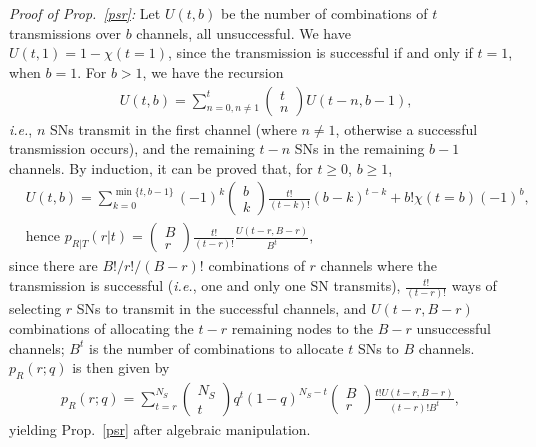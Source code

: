 \documentclass[10pt,twocolumn,twoside]{IEEEtran}
\theoremstyle{plain}
\newcommand{\nn}{\nonumber}
\begin{document}
\section{}
\label{proofoflemchannel}
\noindent\emph{Proof of Prop.~\ref{psr}:}
 Let $U(t,b)$ be the number of combinations of $t$ transmissions over $b$ channels, all unsuccessful.
We have $U(t,1){=}1{-}\chi(t{=}1)$, since the transmission is successful if and only if $t{=}1$, when $b{=}1$.
For $b>1$, we have the recursion
\begin{align*}
&U(t,b)=\sum_{n=0,n\neq 1}^t\left(\begin{array}{c}t\\n\end{array}\right)U(t-n,b-1),
\end{align*}
\emph{i.e.}, $n$ SNs transmit in the first channel (where $n\neq 1$, otherwise 
a successful transmission occurs), and the remaining $t-n$ SNs in the remaining $b-1$ channels.
By induction, it can be proved that, for $t\geq 0$, $b\geq 1$,
\begin{align}
\nn
&U(t,b)\!=\!\!\!\!\!\!\!\!\!\!\sum_{k=0}^{\min\{t,b-1\}}\!\!\!\!\!\!\!\!(-1)^k\!\!
\left(\begin{array}{c}\!\!b\!\!\\\!\!k\!\!\end{array}\right)\!\!
\frac{t!}{(t-k)!}
(b-k)^{t-k}
\!+b!\chi(t=b)(-1)^b,
\\&
\text{hence }p_{R|T}(r|t)=\left(\begin{array}{c}B\\r\end{array}\right)\frac{t!}{(t-r)!}\frac{U(t-r,B-r)}{B^t},
\end{align}
since there are $B!/r!/(B-r)!$ combinations 
of $r$ channels where the transmission is successful (\emph{i.e.}, one and only one SN transmits),
$\frac{t!}{(t-r)!}$ ways of selecting $r$ SNs to transmit in the successful channels, and 
$U(t-r,B-r)$ combinations of allocating the $t-r$ remaining nodes to the $B-r$ unsuccessful channels;
$B^t$ is the number of combinations to allocate $t$ SNs to $B$ channels.
$p_R(r;q)$ is then given by
\begin{align*}
p_R(r;q)=
\sum_{t=r}^{N_S}
\left(\begin{array}{c}\!\!\!\!N_S\!\!\!\!\\\!\!\!\!t\!\!\!\!\end{array}\right)
q^t(1-q)^{N_S-t}\left(\begin{array}{c}\!\!\!B\!\!\!\\\!\!\!r\!\!\!\end{array}\right)\frac{t!U(t-r,B-r)}{(t-r)!B^t},
\end{align*}
yielding Prop.~\ref{psr} after algebraic manipulation.
\hfill\QED
\end{document}
